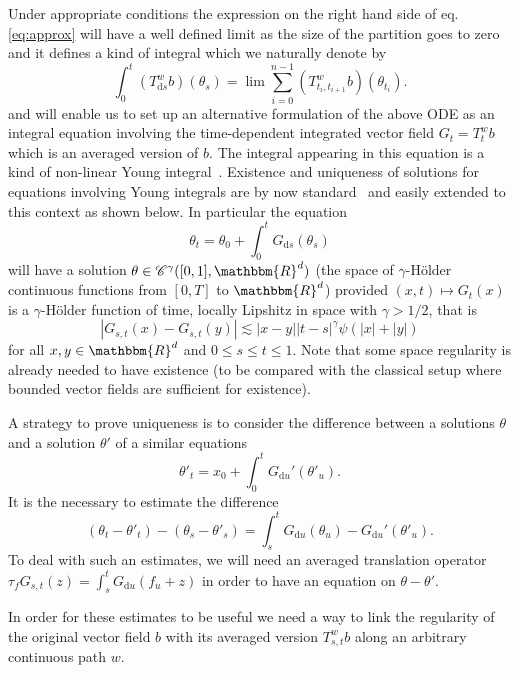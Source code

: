 \documentclass[a4paper,11pt]{article}
\newcommand{\mathd}{\mathrm{d}}
\newcommand{\CC}{\mathscr C}
\begin{document}
Under appropriate conditions the expression on the right hand side of
eq.{\eqref{eq:approx}} will have a well defined limit as the size of the
partition goes to zero and it defines a kind of integral which we naturally
denote by
\[ \int_{0}^{t} (T^{w}_{\mathd s} b) ( \theta_{s} ) = \lim   \sum_{i=0}^{n-1}
   (T^{w}_{t_{i} ,t_{i+1}} b) ( \theta_{t_{i}} ) . \]
and will enable us to set up an alternative formulation of the above ODE as an
integral equation involving the time-dependent integrated vector field $G_{t}
=T^{w}_{t} b$ which is an averaged version of $b$. The integral appearing in
this equation is a kind of non-linear Young integral~{\cite{Young}}. Existence
and uniqueness of solutions for equations involving Young integrals are by now
standard~{\cite{Lyons,controlling,FV}} and easily extended to this context as
shown below. In particular the equation
\[ \theta_{t} = \theta_{0} + \int_{0}^{t} G_{\mathd s} ( \theta_{s} ) \]
will have a solution $\theta \in \CC^{\gamma} ([0,1],\mathbbm{R}^{d} )$ (the
space of $\gamma$-Hölder continuous functions from $[0,T]$ to $\mathbbm{R}^{d}$) provided
$(x,t) \mapsto G_{t} (x)$ is a $\gamma$-Hölder function of time, locally
Lipshitz in space with $\gamma >1/2$, that is
\[ |G_{s,t} (x)-G_{s,t} (y)| \lesssim |x-y|  |t-s|^{\gamma} \psi ( | x | + | y
   | ) \]
for all $x,y \in \mathbbm{R}^{d}$ and $0 \leqslant s \leqslant t \leqslant 1$.
Note that some space regularity is already needed to have existence (to be
compared with the classical setup where bounded vector fields are sufficient for existence).

A strategy to prove uniqueness is to consider the difference between a
solutions $\theta$ and a solution $\theta'$ of a similar equations
\[ \theta'_{t} =x_{0} + \int_{0}^{t} G_{\mathd u}' (\theta'_{u} ) . \]
It is the necessary to estimate the difference
\[ (\theta_{t} -\theta'_{t} ) - (\theta_{s} -\theta'_{s} ) = \int_{s}^{t} G_{\mathd u} (\theta_{u} )
   -G_{\mathd u}' (\theta'_{u} ). \]
To deal with such an estimates, we will need an averaged translation operator
$\tau_{f}  G_{s,t} ( z ) = \int_{s}^{t} G_{\mathd u} ( f_{u} +z )$ in order to
have an equation on $\theta-\theta'$.

In order for these estimates to be useful we need a way to link the
regularity of the original vector field $b$ with its averaged version
$T^{w}_{s,t} b$ along an arbitrary continuous path $w$.
\end{document}
